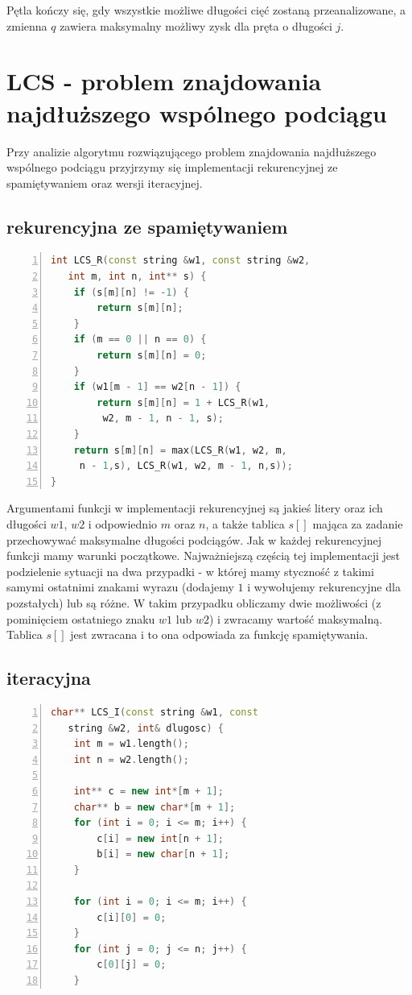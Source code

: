 \documentclass{article}
\begin{document}
\large{Pętla kończy się, gdy wszystkie możliwe długości cięć zostaną przeanalizowane, a zmienna $q$ zawiera maksymalny możliwy zysk dla pręta o długości $j$.}

\section{LCS - problem znajdowania najdłuższego wspólnego podciągu}

\large{Przy analizie algorytmu rozwiązującego problem znajdowania najdłuższego wspólnego podciągu przyjrzymy się implementacji rekurencyjnej ze spamiętywaniem oraz wersji iteracyjnej.}

\subsection{rekurencyjna ze spamiętywaniem}

\begin{lstlisting}[language=C++, caption={Kod funkcji znajdowania nadłuższego wspólnego podciągu w wersji rekurencyjnej}, numbers=left, frame=single, xleftmargin=20pt]
int LCS_R(const string &w1, const string &w2, 
   int m, int n, int** s) {
	if (s[m][n] != -1) {
		return s[m][n];
	}
	if (m == 0 || n == 0) {
		return s[m][n] = 0;
	}
	if (w1[m - 1] == w2[n - 1]) {
		return s[m][n] = 1 + LCS_R(w1,
		 w2, m - 1, n - 1, s);
	}
	return s[m][n] = max(LCS_R(w1, w2, m,
	 n - 1,s), LCS_R(w1, w2, m - 1, n,s));
}
\end{lstlisting}

\large{Argumentami funkcji w implementacji rekurencyjnej są jakieś litery oraz ich długości $w1$, $w2$ i odpowiednio $m$ oraz $n$, a także tablica $s[]$ mająca za zadanie przechowywać maksymalne długości podciągów. Jak w każdej rekurencyjnej funkcji mamy warunki początkowe. Najważniejszą częścią tej implementacji jest podzielenie sytuacji na dwa przypadki - w której mamy styczność z takimi samymi ostatnimi znakami wyrazu (dodajemy $1$ i wywołujemy rekurencyjne dla pozstałych) lub są różne. W takim przypadku obliczamy dwie możliwości (z pominięciem ostatniego znaku $w1$ lub $w2$) i zwracamy wartość maksymalną. Tablica $s[]$ jest zwracana i to ona odpowiada za funkcję spamiętywania.}

\subsection{iteracyjna}
\begin{lstlisting}[language=C++, caption={Kod funkcji znajdowania nadłuższego wspólnego podciągu w wersji iteracyjnej}, numbers=left, frame=single, xleftmargin=20pt]
char** LCS_I(const string &w1, const 
   string &w2, int& dlugosc) {
	int m = w1.length();
	int n = w2.length();
	
	int** c = new int*[m + 1];
	char** b = new char*[m + 1];
	for (int i = 0; i <= m; i++) {
		c[i] = new int[n + 1];
		b[i] = new char[n + 1];
	}
	
	for (int i = 0; i <= m; i++) {
		c[i][0] = 0;
	}
	for (int j = 0; j <= n; j++) {
		c[0][j] = 0;
	}
\end{lstlisting}
\end{document}

